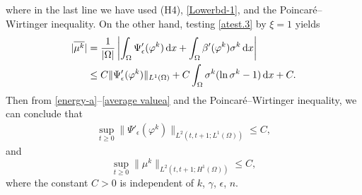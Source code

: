 \documentclass[11pt,reqno]{amsart}
\begin{document}
where in the last line we have used (H4), \eqref{Lowerbd-1}, and the Poincar\'{e}--Wirtinger inequality. On the other hand, testing \eqref{atest.3} by $\xi=1$ yields
%
\begin{align}
|\overline{\mu^{k}}|
&=
\frac{1}{|\Omega|} \left| \int_\Omega \Psi'_\epsilon(\varphi^{k}) \,\mathrm{d}x + \int_\Omega \beta'(\varphi^k)\sigma^{k} \,\mathrm{d}x \right|
\notag \\
 & \le C\|\Psi'_\epsilon(\varphi^{k})\|_{L^1(\Omega)}
 +C \int_\Omega \sigma^{k}(\ln \sigma^k-1)\,\mathrm{d}x+C.
\label{average valuea}
\end{align}
%
Then from \eqref{energy-a}--\eqref{average valuea} and the Poincar\'{e}--Wirtinger inequality, we can conclude
that %
\begin{align}
\sup_{t\geq 0}\|\Psi'_\epsilon(\varphi^{k})\|_{L^2(t,t+1;L^1(\Omega))}\leq C,
\label{Psid-1}
\end{align}
%
and
\begin{equation}
\sup_{t\geq 0} \|  \mu^{k} \|_{L^{2}(t,t+1;H^1(\Omega))}\le C,
\label{mu}
\end{equation}
where the constant $C>0$ is independent of $k$, $\gamma$, $\epsilon$, $n$.
\medskip
\end{document}
